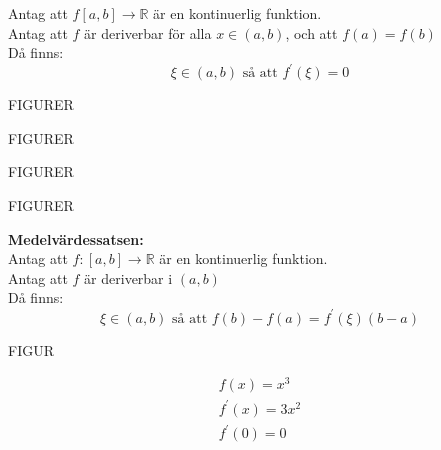 \begin{sats}
    Antag att $f[a,b] \to \mathbb{R}$ är en kontinuerlig funktion.\\
    Antag att $f$ är deriverbar för alla $x \in (a,b)$, och att $f(a) = f(b)$\\
    Då finns:
    \[
    \xi \in (a,b) \mbox{ så att } f ^\prime(\xi) = 0
    \]
\end{sats}
\begin{bevis}
	\begin{center}
		FIGURER
	\end{center}
	\begin{center}
		FIGURER
	\end{center}
	\begin{center}
		FIGURER
	\end{center}
	\begin{center}
		FIGURER
	\end{center}
\end{bevis}
\begin{sats}
    \textbf{Medelvärdessatsen:}\\
    Antag att $f:[a,b] \to \mathbb{R}$ är en kontinuerlig funktion. \\
    Antag att $f$ är deriverbar i $(a,b)$\\
    Då finns:
    \[
    \xi \in (a,b) \mbox{ så att } f(b) - f(a) = f ^\prime(\xi)(b-a)
    \]
    \begin{center}
    	FIGUR
    \end{center}
\end{sats}
\begin{Ex}
    \begin{align*}
    	f(x) = x^3\\
    	f ^\prime(x) = 3x^2\\
    	f ^\prime(0) = 0
    \end{align*}
    \begin{center}
    	
    \end{center}
\end{Ex}




























